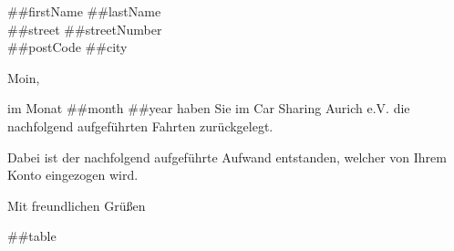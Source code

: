 \documentclass[%
    parskip=half,
    fromalign=right,  %
    fromphone=false, fromfax=false,
    fromrule=false]{scrlttr2}
\begin{document}
\begin{letter}{ ##firstName ##lastName \\ ##street ##streetNumber\\ ##postCode ##city } 

\opening{Moin,}

im Monat ##month ##year haben Sie im Car Sharing Aurich e.V. die nachfolgend aufgeführten Fahrten zurückgelegt.

Dabei ist der nachfolgend aufgeführte Aufwand entstanden, welcher von Ihrem Konto eingezogen wird.

\closing{Mit freundlichen Grüßen}


##table

\end{letter}
\end{document}
